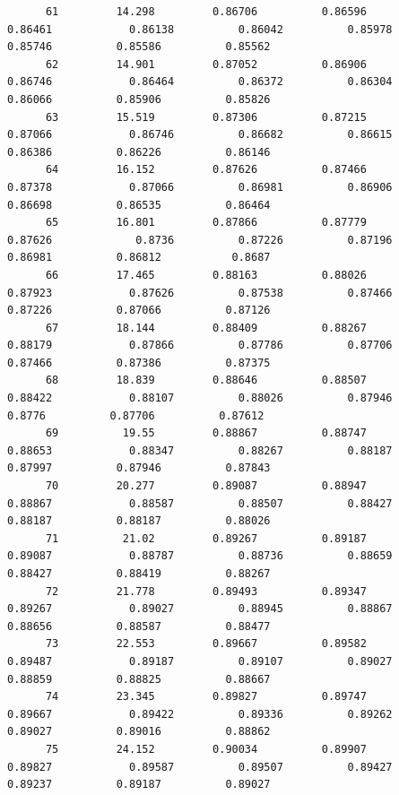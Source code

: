 \documentclass[
]{book}
\begin{document}
\begin{verbatim}
      61         14.298         0.86706          0.86596           0.86461            0.86138          0.86042          0.85978          0.85746          0.85586          0.85562   
      62         14.901         0.87052          0.86906           0.86746            0.86464          0.86372          0.86304          0.86066          0.85906          0.85826   
      63         15.519         0.87306          0.87215           0.87066            0.86746          0.86682          0.86615          0.86386          0.86226          0.86146   
      64         16.152         0.87626          0.87466           0.87378            0.87066          0.86981          0.86906          0.86698          0.86535          0.86464   
      65         16.801         0.87866          0.87779           0.87626             0.8736          0.87226          0.87196          0.86981          0.86812           0.8687   
      66         17.465         0.88163          0.88026           0.87923            0.87626          0.87538          0.87466          0.87226          0.87066          0.87126   
      67         18.144         0.88409          0.88267           0.88179            0.87866          0.87786          0.87706          0.87466          0.87386          0.87375   
      68         18.839         0.88646          0.88507           0.88422            0.88107          0.88026          0.87946           0.8776          0.87706          0.87612   
      69          19.55         0.88867          0.88747           0.88653            0.88347          0.88267          0.88187          0.87997          0.87946          0.87843   
      70         20.277         0.89087          0.88947           0.88867            0.88587          0.88507          0.88427          0.88187          0.88187          0.88026   
      71          21.02         0.89267          0.89187           0.89087            0.88787          0.88736          0.88659          0.88427          0.88419          0.88267   
      72         21.778         0.89493          0.89347           0.89267            0.89027          0.88945          0.88867          0.88656          0.88587          0.88477   
      73         22.553         0.89667          0.89582           0.89487            0.89187          0.89107          0.89027          0.88859          0.88825          0.88667   
      74         23.345         0.89827          0.89747           0.89667            0.89422          0.89336          0.89262          0.89027          0.89016          0.88862   
      75         24.152         0.90034          0.89907           0.89827            0.89587          0.89507          0.89427          0.89237          0.89187          0.89027   

\end{verbatim}
\end{document}
